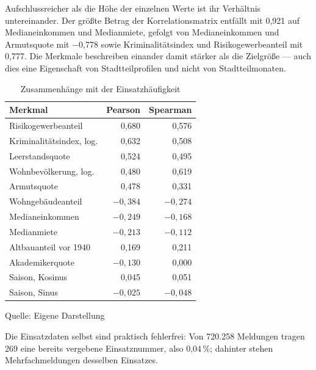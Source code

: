 \documentclass[12pt,a4paper]{article}
\renewcommand{\footnotesize}{\fontsize{10pt}{12pt}\selectfont}
\newcommand{\tabformat}{%
  \centering
  \singlespacing
  \footnotesize
  \setlength{\tabcolsep}{5pt}%
  \renewcommand{\arraystretch}{1.15}%
}
\newcommand{\tabquelle}[1][Eigene Darstellung]{%
  \par\setlength{\parskip}{0pt}\vspace{3pt}%
  {\setstretch{1}\fontsize{9pt}{11pt}\selectfont\raggedright Quelle: #1\par}%
}
\begin{document}
Aufschlussreicher als die Höhe der einzelnen Werte ist ihr Verhältnis untereinander. Der größte Betrag der Korrelationsmatrix entfällt mit 0,921 auf Medianeinkommen und Medianmiete, gefolgt von Medianeinkommen und Armutsquote mit −0,778 sowie Kriminalitätsindex und Risikogewerbeanteil mit 0,777. Die Merkmale beschreiben einander damit stärker als die Zielgröße --- auch dies eine Eigenschaft von Stadtteilprofilen und nicht von Stadtteilmonaten.

\begin{table}[htbp]
    \tabformat
    \caption{Zusammenhänge mit der Einsatzhäufigkeit}
    \label{tab:zusammenhaenge}
    \begin{tabularx}{\textwidth}{@{}Y r r@{}}
        \toprule
        \textbf{Merkmal} & \textbf{Pearson} & \textbf{Spearman} \\
        \midrule
        Risikogewerbeanteil          & 0,680  & 0,576  \\
        Kriminalitätsindex, log.     & 0,632  & 0,508  \\
        Leerstandsquote              & 0,524  & 0,495  \\
        Wohnbevölkerung, log.        & 0,480  & 0,619  \\
        Armutsquote                  & 0,478  & 0,331  \\
        Wohngebäudeanteil            & $-0{,}384$ & $-0{,}274$ \\
        Medianeinkommen              & $-0{,}249$ & $-0{,}168$ \\
        Medianmiete                  & $-0{,}213$ & $-0{,}112$ \\
        Altbauanteil vor 1940        & 0,169  & 0,211  \\
        Akademikerquote              & $-0{,}130$ & 0,000  \\
        Saison, Kosinus              & 0,045  & 0,051  \\
        Saison, Sinus                & $-0{,}025$ & $-0{,}048$ \\
        \bottomrule
    \end{tabularx}
    \tabquelle
\end{table}

Die Einsatzdaten selbst sind praktisch fehlerfrei: Von 720.258 Meldungen tragen 269 eine bereits vergebene Einsatznummer, also 0,04\,\%; dahinter stehen Mehrfachmeldungen desselben Einsatzes.
\end{document}
